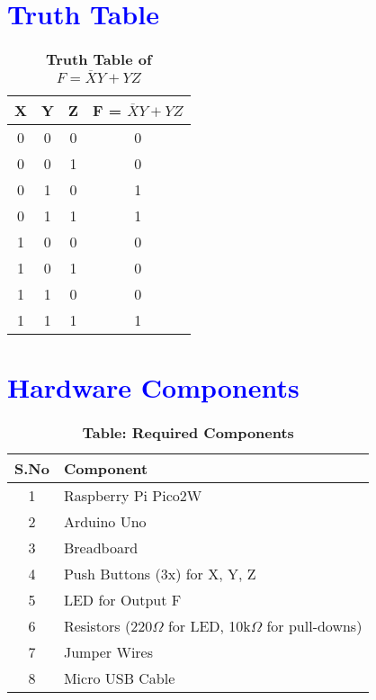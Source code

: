 \documentclass[twocolumn]{article}
\begin{document}
\section*{\textcolor{blue}{Truth Table}}
\begin{table}[H]
\centering
\renewcommand{\arraystretch}{1.3}
\begin{tabular}{|c|c|c|c|}
\hline
X & Y & Z & F = \( \overline{X}Y + YZ \) \\
\hline
0 & 0 & 0 & 0 \\
0 & 0 & 1 & 0 \\
0 & 1 & 0 & 1 \\
0 & 1 & 1 & 1 \\
1 & 0 & 0 & 0 \\
1 & 0 & 1 & 0 \\
1 & 1 & 0 & 0 \\
1 & 1 & 1 & 1 \\
\hline
\end{tabular}
\caption*{\textbf{Truth Table of } \( F = \overline{X}Y + YZ \)}
\end{table}

\section*{\textcolor{blue}{Hardware Components}}
\begin{table}[H]
\centering
\renewcommand{\arraystretch}{1.3}
\begin{tabular}{|c|l|}
\hline
\textbf{S.No} & \textbf{Component} \\ \hline
1 & Raspberry Pi Pico2W \\
2 & Arduino Uno \\
3 & Breadboard \\
4 & Push Buttons (3x) for X, Y, Z \\
5 & LED for Output F \\
6 & Resistors (220\(\Omega\) for LED, 10k\(\Omega\) for pull-downs) \\
7 & Jumper Wires \\
8 & Micro USB Cable \\
\hline
\end{tabular}
\caption*{\textbf{Table: Required Components}}
\end{table}
\end{document}
